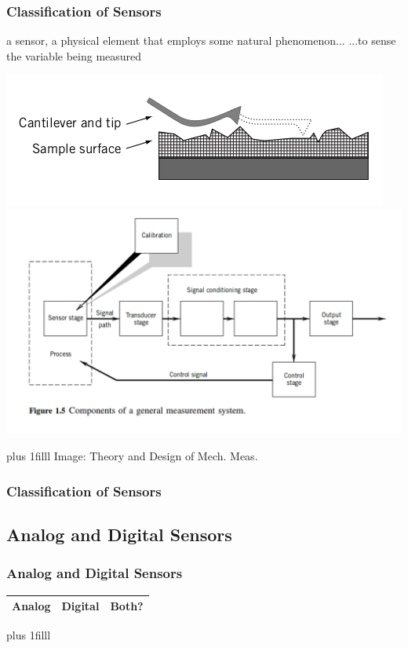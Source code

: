 \documentclass[fleqn]{beamer} %
\newcommand{\sectionIsubsectionItitle}{Classification of Sensors}
\newcommand{\sectionIsubsectionIItitle}{Analog and Digital Sensors}
\newcommand{\btVFill}{\vskip0pt plus 1filll}
\begin{document}
			\begin{frame}
				\frametitle{\sectionIsubsectionItitle}
				
				a {\PR sensor}, a physical element that employs some natural phenomenon... ...to sense the variable being measured
	
				\includegraphics[scale=0.30]{images/sensor_stage.png}\includegraphics[scale=0.20]{images/measurement_stages.png}

				\btVFill
				{\tiny Image: Theory and Design of Mech. Meas.}

			\end{frame}

			\begin{frame}
				\frametitle{\sectionIsubsectionItitle}

	

			\end{frame}

		\subsection{\sectionIsubsectionIItitle}\label{sectionIsubsectionII}

			\begin{frame}
				\frametitle{\sectionIsubsectionIItitle}



				\begin{tabular}{|c|c|c|} \hline
				 	Analog \hspace*{10mm}& Digital \hspace*{10mm}& Both? \hspace*{10mm} \\ \hline   
				\end{tabular}	

				                              
 		
				\btVFill

			\end{frame}
\end{document}

